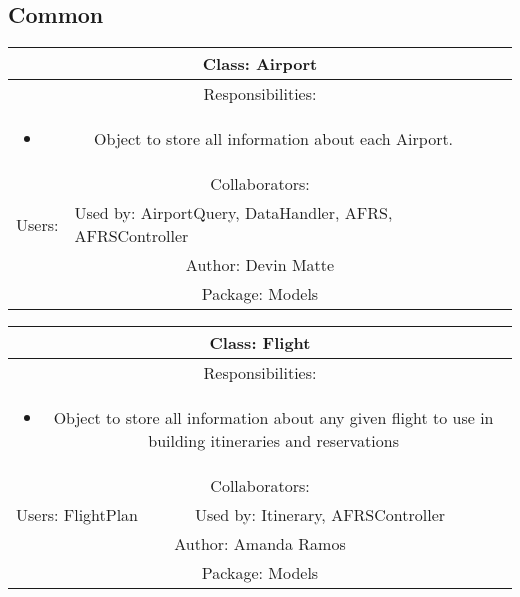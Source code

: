 
\subsection{Common}\label{subsec:common}

\begin{center}
    \begin{tabular}{ |p{7cm}|p{7cm}|  }
        \hline
        \multicolumn{2}{|c|}{Class: Airport} \\
        \hline
        \multicolumn{2}{|c|}{Responsibilities:} \\ \multicolumn{2}{|c|}{\parbox{0.9\textwidth}{
        \begin{itemize}
            \item Object to store all information about each Airport.
        \end{itemize} }} \\
        \hline
        \multicolumn{2}{|c|}{Collaborators:} \\
        \hline
        Users: & Used by: AirportQuery, DataHandler, AFRS, AFRSController \\
        \hline
        \multicolumn{2}{|c|}{Author: Devin Matte} \\
        \hline
        \multicolumn{2}{|c|}{Package: Models} \\
        \hline
    \end{tabular}
\end{center}


\begin{center}
    \begin{tabular}{ |p{7cm}|p{7cm}|  }
        \hline
        \multicolumn{2}{|c|}{Class: Flight} \\
        \hline
        \multicolumn{2}{|c|}{Responsibilities:} \\ \multicolumn{2}{|c|}{\parbox{0.9\textwidth}{
        \begin{itemize}
            \item Object to store all information about any given flight to use in building itineraries and reservations
        \end{itemize} }} \\
        \hline
        \multicolumn{2}{|c|}{Collaborators:} \\
        \hline
        Users: FlightPlan & Used by: Itinerary, AFRSController \\
        \hline
        \multicolumn{2}{|c|}{Author: Amanda Ramos} \\
        \hline
        \multicolumn{2}{|c|}{Package: Models} \\
        \hline
    \end{tabular}
\end{center}


